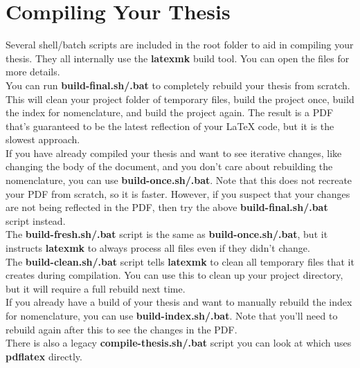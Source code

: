 
\chapter{Compiling Your Thesis}%
\label{ch:compiling}%


Several shell/batch scripts are included in the root folder to aid in compiling your thesis.
They all internally use the \textbf{latexmk} build tool.
You can open the files for more details.\\

\noindent You can run \textbf{build-final.sh/.bat} to completely rebuild your thesis from scratch.
This will clean your project folder of temporary files, build the project once, build the index for nomenclature, and build the project again.
The result is a PDF that's guaranteed to be the latest reflection of your \LaTeX{} code, but it is the slowest approach.\\

\noindent If you have already compiled your thesis and want to see iterative changes, like changing the body of the document, and you don't care about rebuilding the nomenclature, you can use \textbf{build-once.sh/.bat}.
Note that this does not recreate your PDF from scratch, so it is faster.
However, if you suspect that your changes are not being reflected in the PDF, then try the above \textbf{build-final.sh/.bat} script instead.\\

\noindent The \textbf{build-fresh.sh/.bat} script is the same as \textbf{build-once.sh/.bat}, but it instructs \textbf{latexmk} to always process all files even if they didn't change.\\

\noindent The \textbf{build-clean.sh/.bat} script tells \textbf{latexmk} to clean all temporary files that it creates during compilation.
You can use this to clean up your project directory, but it will require a full rebuild next time.\\

\noindent If you already have a build of your thesis and want to manually rebuild the index for nomenclature, you can use \textbf{build-index.sh/.bat}.
Note that you'll need to rebuild again after this to see the changes in the PDF.\\

\noindent There is also a legacy \textbf{compile-thesis.sh/.bat} script you can look at which uses \textbf{pdflatex} directly.
